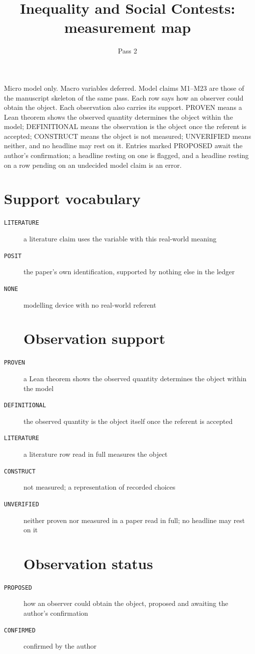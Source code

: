 \documentclass[10pt]{article}
\title{Inequality and Social Contests: measurement map}
\date{Pass 2}
\begin{document}
\maketitle
Micro model only. Macro variables deferred. Model claims M1--M23 are those of the manuscript skeleton of the same pass. Each row says how an observer could obtain the object. Each observation also carries its support. PROVEN means a Lean theorem shows the observed quantity determines the object within the model; DEFINITIONAL means the observation is the object once the referent is accepted; CONSTRUCT means the object is not measured; UNVERIFIED means neither, and no headline may rest on it. Entries marked PROPOSED await the author's confirmation; a headline resting on one is flagged, and a headline resting on a row pending on an undecided model claim is an error.

\section*{Support vocabulary}
\begin{description}
\item[\texttt{LITERATURE}] a literature claim uses the variable with this real-world meaning
\item[\texttt{POSIT}] the paper's own identification, supported by nothing else in the ledger
\item[\texttt{NONE}] modelling device with no real-world referent

\section*{Observation support}

\item[\texttt{PROVEN}] a Lean theorem shows the observed quantity determines the object within the model
\item[\texttt{DEFINITIONAL}] the observed quantity is the object itself once the referent is accepted
\item[\texttt{LITERATURE}] a literature row read in full measures the object
\item[\texttt{CONSTRUCT}] not measured; a representation of recorded choices
\item[\texttt{UNVERIFIED}] neither proven nor measured in a paper read in full; no headline may rest on it

\section*{Observation status}

\item[\texttt{PROPOSED}] how an observer could obtain the object, proposed and awaiting the author's confirmation
\item[\texttt{CONFIRMED}] confirmed by the author
\end{description}
\end{document}
